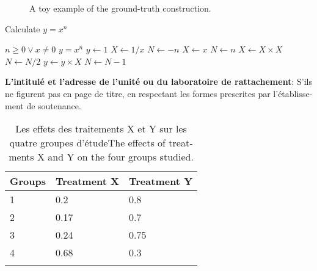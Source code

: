 \begin{otherlanguage}{french}
\begin{figure}[!htb]
		\caption[A toy example of the ground-truth construction.]{A toy example of the ground-truth construction.}%
		\label{fig:gt-dtw}
	\end{figure}
	
	\begin{algorithm}
		\caption{Calculate $y = x^n$}
		\begin{algorithmic}
			\REQUIRE $n \geq 0 \vee x \neq 0$
			\ENSURE $y = x^n$
			\STATE $y \leftarrow 1$
			\STATE $X \leftarrow 1 / x$
			\STATE $N \leftarrow -n$
			\ELSE
			\STATE $X \leftarrow x$
			\STATE $N \leftarrow n$
			\ENDIF
			\STATE $X \leftarrow X \times X$
			\STATE $N \leftarrow N / 2$
			\ELSE[$N$ is odd]
			\STATE $y \leftarrow y \times X$
			\STATE $N \leftarrow N - 1$
			\ENDIF
			\ENDWHILE
		\end{algorithmic}
	\end{algorithm}
	
	\textbf{L’intitulé et l'adresse de l'unité ou du laboratoire de rattachement}:
	S’ils ne figurent pas en page de titre, en respectant les formes prescrites par l’établissement de soutenance.
	
	
	\begin{table}
		\caption{Les effets des traitements X et Y sur les quatre groupes d'étudeThe effects of treatments X and Y on the four groups studied.}%
		\label{tab:treatmentsf}
		\centering
		\begin{tabular}{l l l}
			\toprule
			Groups & Treatment X & Treatment Y \\
			\midrule
			1 & 0.2 & 0.8\\
			2 & 0.17 & 0.7\\
			3 & 0.24 & 0.75\\
			4 & 0.68 & 0.3\\
			\bottomrule\\
		\end{tabular}
	\end{table}
	
\end{otherlanguage}
